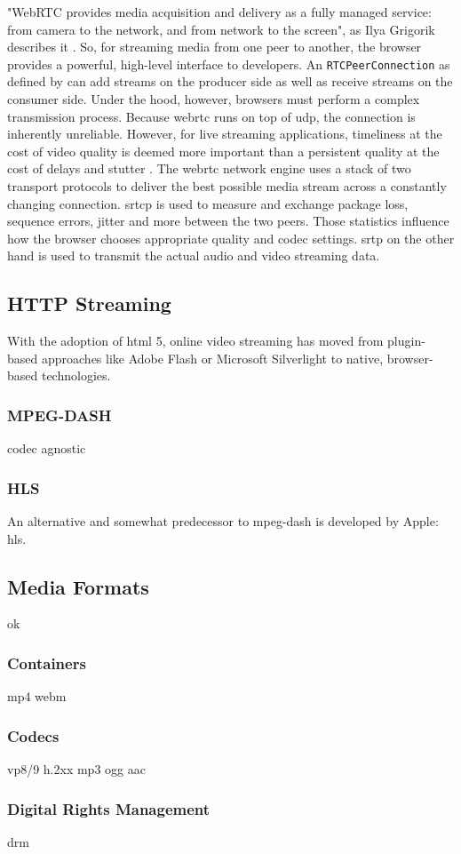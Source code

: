 "WebRTC provides media acquisition and delivery as a fully managed service: from camera to the network, and from network to the screen", as Ilya Grigorik describes it \cite[\S18.5]{high-performance-browser-networking}. So, for streaming media from one peer to another, the browser provides a powerful, high-level interface to developers. An \lstinline|RTCPeerConnection| as defined by \cite[\S4.4]{webrtc-w3c} can add streams on the producer side as well as receive streams on the consumer side. Under the hood, however, browsers must perform a complex transmission process. Because \gls{webrtc} runs on top of \gls{udp}, the connection is inherently unreliable. However, for live streaming applications, timeliness at the cost of video quality is deemed more important than a persistent quality at the cost of delays and stutter \cite[\S18.3]{high-performance-browser-networking}. The \gls{webrtc} network engine uses a stack of two transport protocols to deliver the best possible media stream across a constantly changing connection. \Gls{srtcp} is used to measure and exchange package loss, sequence errors, jitter and more between the two peers. Those statistics influence how the browser chooses appropriate quality and codec settings. \gls{srtp} on the other hand is used to transmit the actual audio and video streaming data.

\subsection{HTTP Streaming}
\label{subsec:http-streaming}

With the adoption of \gls{html} 5, online video streaming has moved from plugin-based approaches like Adobe Flash \cite{adobe-flash} or Microsoft Silverlight \cite{microsoft-silverlight} to native, browser-based technologies.

\subsubsection{MPEG-DASH}
codec agnostic

\subsubsection{HLS}
An alternative and somewhat predecessor to \gls{mpeg-dash} is developed by Apple: \gls{hls}.

\subsection{Media Formats}
ok

\subsubsection{Containers}
mp4
webm

\subsubsection{Codecs}
vp8/9
h.2xx
mp3
ogg
aac

\subsubsection{Digital Rights Management}
drm
